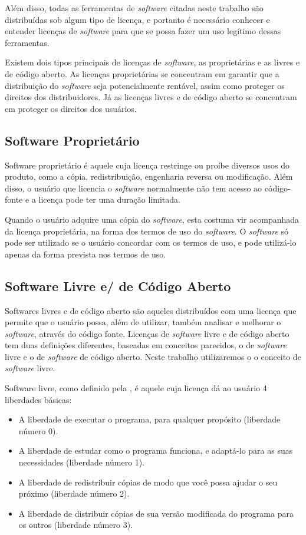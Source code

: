 Além disso, todas as ferramentas de \emph{software} citadas neste trabalho são distribuídas sob algum tipo de licença, e portanto é necessário conhecer e entender licenças de \emph{software} para que se possa fazer um uso legítimo dessas ferramentas.

Existem dois tipos principais de licenças de \emph{software}, as proprietárias e as livres e de código aberto. As licenças proprietárias se concentram em garantir que a distribuição do \emph{software} seja potencialmente rentável, assim como proteger os direitos dos distribuidores. Já as licenças livres e de código aberto se concentram em proteger os direitos dos usuários.

\subsection{Software Proprietário} 

Software proprietário é aquele cuja licença restringe ou proíbe diversos usos do produto, como a cópia, redistribuição, engenharia reversa ou modificação. Além disso, o usuário que licencia o \emph{software} normalmente não tem acesso ao código-fonte e a licença pode ter uma duração limitada.

Quando o usuário adquire uma cópia do \emph{software}, esta costuma vir acompanhada da licença proprietária, na forma dos termos de uso do \emph{software}. O \emph{software} só pode ser utilizado se o usuário concordar com os termos de uso, e pode utilizá-lo apenas da forma prevista nos termos de uso.

\subsection{Software Livre e/ de Código Aberto}

Softwares livres e de código aberto são aqueles distribuídos com uma licença que permite que o usuário possa, além de utilizar, também analisar e melhorar o \emph{software}, através do código fonte. Licenças de \emph{software} livre e de código aberto tem duas definições diferentes, baseadas em conceitos parecidos, o de \emph{software} livre e o de \emph{software} de código aberto. Neste trabalho utilizaremos o o conceito de \emph{software} livre.

Software livre, como definido pela , é aquele cuja licença dá ao usuário 4 liberdades básicas\cite{GNUFreeSoftware}:

\begin{itemize}

\item A liberdade de executar o programa, para qualquer propósito (liberdade número 0).
\item A liberdade de estudar como o programa funciona, e adaptá-lo para as suas necessidades (liberdade número 1).
\item A liberdade de redistribuir cópias de modo que você possa ajudar o seu próximo (liberdade número 2).
\item A liberdade de distribuir cópias de sua versão modificada do programa para os outros (liberdade número 3).

\end{itemize}

